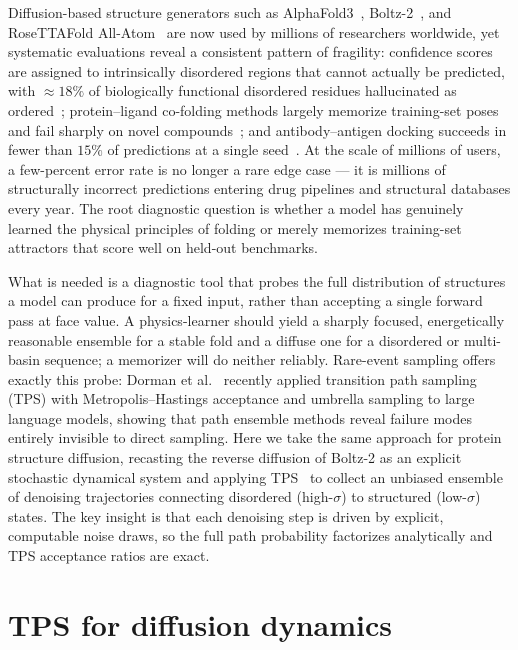 \documentclass[aps,prl,twocolumn,superscriptaddress,floatfix]{revtex4-2}
\begin{document}
Diffusion-based structure generators such as AlphaFold3~\cite{alphafold3},
Boltz-2~\cite{boltz2}, and RoseTTAFold All-Atom~\cite{rfaa} are now used by
millions of researchers worldwide, yet systematic evaluations reveal a
consistent pattern of fragility: confidence scores are assigned to
intrinsically disordered regions that cannot actually be predicted, with
$\approx 18\%$ of biologically functional disordered residues
hallucinated as ordered~\cite{gopalan2025}; protein--ligand co-folding methods
largely memorize training-set poses and fail sharply on novel
compounds~\cite{skrinjar2025}; and antibody--antigen docking succeeds in fewer
than $15\%$ of predictions at a single seed~\cite{hitawala2025}.  At the scale
of millions of users, a few-percent error rate is no longer a rare edge case —
it is millions of structurally incorrect predictions entering drug pipelines
and structural databases every year.  The root diagnostic question is whether a
model has genuinely learned the physical principles of folding or merely
memorizes training-set attractors that score well on held-out benchmarks.

What is needed is a diagnostic tool that probes the full distribution of
structures a model can produce for a fixed input, rather than accepting a
single forward pass at face value.  A physics-learner should yield a sharply
focused, energetically reasonable ensemble for a stable fold and a diffuse one
for a disordered or multi-basin sequence; a memorizer will do neither
reliably.  Rare-event sampling offers exactly this probe: Dorman
et al.~\cite{dorman2026} recently applied transition path sampling (TPS) with
Metropolis--Hastings acceptance and umbrella sampling to large language models,
showing that path ensemble methods reveal failure modes entirely invisible to
direct sampling.  Here we take the same approach for protein structure
diffusion, recasting the reverse diffusion of Boltz-2 as an explicit
stochastic dynamical system and applying
TPS~\cite{dellago1998,bolhuis2002} to collect an unbiased ensemble of
denoising trajectories connecting disordered (high-$\sigma$) to structured
(low-$\sigma$) states.  The key insight is that each denoising step is driven
by explicit, computable noise draws, so the full path probability factorizes
analytically and TPS acceptance ratios are exact.

\section{TPS for diffusion dynamics}
\end{document}
